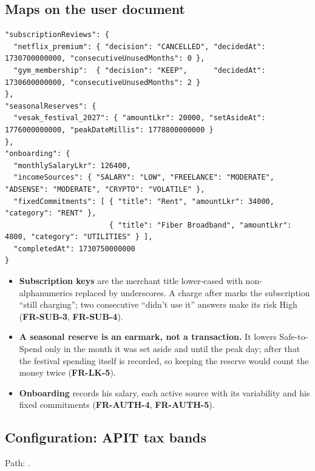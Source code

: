 \documentclass[11pt,a4paper]{article}
\newcommand{\req}[1]{\textsf{\textbf{\color{pfgreendark}#1}}}
\begin{document}
\subsection{Maps on the user document}
\begin{lstlisting}
"subscriptionReviews": {
  "netflix_premium": { "decision": "CANCELLED", "decidedAt": 1730700000000, "consecutiveUnusedMonths": 0 },
  "gym_membership":  { "decision": "KEEP",      "decidedAt": 1730600000000, "consecutiveUnusedMonths": 2 }
},
"seasonalReserves": {
  "vesak_festival_2027": { "amountLkr": 20000, "setAsideAt": 1776000000000, "peakDateMillis": 1778800000000 }
},
"onboarding": {
  "monthlySalaryLkr": 126400,
  "incomeSources": { "SALARY": "LOW", "FREELANCE": "MODERATE", "ADSENSE": "MODERATE", "CRYPTO": "VOLATILE" },
  "fixedCommitments": [ { "title": "Rent", "amountLkr": 34000, "category": "RENT" },
                        { "title": "Fiber Broadband", "amountLkr": 4800, "category": "UTILITIES" } ],
  "completedAt": 1730750000000
}
\end{lstlisting}
\begin{itemize}
  \item \textbf{Subscription keys} are the merchant title lower-cased with non-alphanumerics replaced by underscores. A charge after  marks the subscription ``still charging''; two consecutive ``didn't use it'' answers make its risk High (\req{FR-SUB-3}, \req{FR-SUB-4}).
  \item \textbf{A seasonal reserve is an earmark, not a transaction.} It lowers Safe-to-Spend only in the month it was set aside and until the peak day; after that the festival spending itself is recorded, so keeping the reserve would count the money twice (\req{FR-LK-5}).
  \item \textbf{Onboarding} records his salary, each active source with its variability and his fixed commitments (\req{FR-AUTH-4}, \req{FR-AUTH-5}).
\end{itemize}

\subsection{Configuration: APIT tax bands}
Path: .
\end{document}

